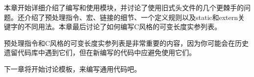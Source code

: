 本章开始详细介绍了编写和使用模块，并讨论了使用旧式头文件的几个更棘手的问题。还介绍了预处理指令、宏、链接的细节、一个定义规则以及static和extern关键字的不同用法。本章最后讨论了如何编写C风格的可变长度实参列表。

预处理指令和C风格的可变长度实参列表是非常重要的内容，因为你可能会在历史遗留代码库中遇到它们，但在新编写的代码中应避免使用它们。

下一章将开始讨论模板，来编写通用代码吧。
